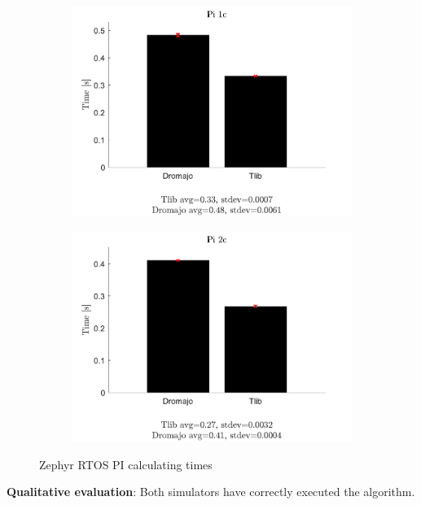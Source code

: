 \begin{figure}[h]
    \centering
    \begin{subfigure}{0.5\textwidth}
      \centering
      \includegraphics[width=1.2\linewidth]{figures/benchmarks/Pi1c.pdf}
    \end{subfigure}%
    \begin{subfigure}{0.5\textwidth}
      \centering
      \includegraphics[width=1.2\linewidth]{figures/benchmarks/Pi2c.pdf}
    \end{subfigure}
    \caption{Zephyr RTOS PI calculating times}
\end{figure}
\textbf{Qualitative evaluation}: Both simulators have correctly executed the algorithm.

